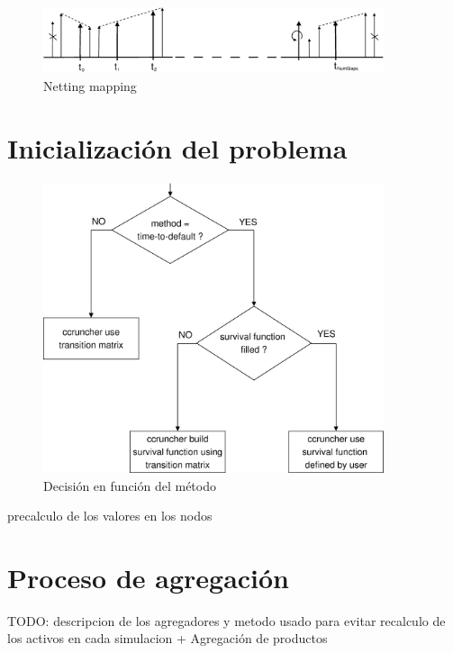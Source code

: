 \begin{figure}[!hb]
\begin{center}
\includegraphics[width=10cm,angle=0]{./images/nettingmapping.eps}
\caption{Netting mapping}
\label{timetranches}
\end{center}
\end{figure}


\section{Inicializaci\'on del problema}


\begin{figure}[!hb]
\begin{center}
\includegraphics[width=10cm,angle=0]{./images/decisiontree1.eps}
\caption{Decisi\'on en funci\'on del m\'etodo}
\label{decisiontree1}
\end{center}
\end{figure}

precalculo de los valores en los nodos


\section{Proceso de agregaci\'on}

TODO: descripcion de los agregadores y metodo usado para evitar recalculo 
de los activos en cada simulacion + Agregaci\'on de productos


